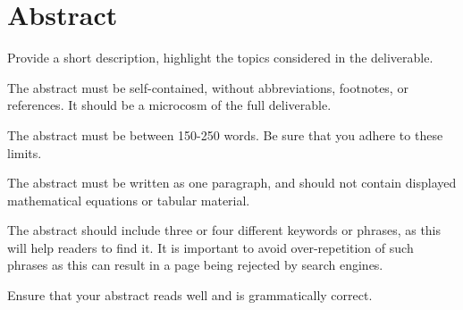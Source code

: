 \section*{Abstract}
Provide a short description, highlight the topics considered in the deliverable.

The abstract must be self-contained, without abbreviations, footnotes, or references. It should be a microcosm of the full deliverable.

The abstract must be between 150-250 words. Be sure that you adhere to these limits.

The abstract must be written as one paragraph, and should not contain displayed mathematical equations or tabular material.

The abstract should include three or four different keywords or phrases, as this will help readers to find it. It is important to avoid over-repetition of such phrases as this can result in a page being rejected by search engines.

Ensure that your abstract reads well and is grammatically correct.
\clearpage

